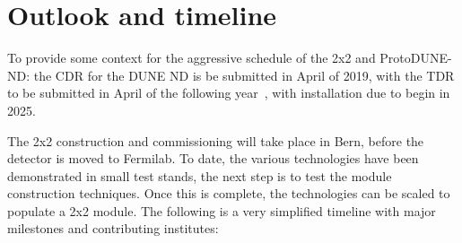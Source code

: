 \section{Outlook and timeline}
\label{sec:outlook}
To provide some context for the aggressive schedule of the 2x2 and ProtoDUNE-ND: the CDR for the DUNE ND is be submitted in April of 2019, with the TDR to be submitted in April of the following year~\cite{dune_dates}, with installation due to begin in 2025. 

The 2x2 construction and commissioning will take place in Bern, before the detector is moved to Fermilab. To date, the various technologies have been demonstrated in small test stands, the next step is to test the module construction techniques. Once this is complete, the technologies can be scaled to populate a 2x2 module. The following is a very simplified timeline with major milestones and contributing institutes:      

